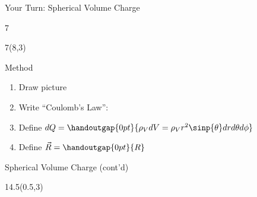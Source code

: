 \begin{lesson20}
\begin{frame}{Your Turn: Spherical Volume Charge}
\begin{textblock}{7}
\end{textblock}
\begin{textblock}{7}(8,3)

\begin{myblock}[0.94]{Method}
	\begin{enumerate}
	\setlength\itemsep{8pt}
		\item Draw picture 
		\item Write ``Coulomb's Law'':
			
			\vspace{-18pt}
			\vspace{-28pt}
			
		\item Define $dQ = \handoutgap{0pt}{\rho_V dV = \rho_V r^2\sinp{\theta}dr d\theta d\phi}$ 
		
		\item Define $\vec{R} = \handoutgap{0pt}{R}$
		
		\vspace{-12pt}
		
		\vspace{-12pt}
				
	\end{enumerate}
\end{myblock}
	
\end{textblock}
\end{frame}



\begin{frame}{Spherical Volume Charge (cont'd)}
\begin{textblock}{14.5}(0.5,3)


\end{textblock}
\end{frame}
\end{lesson20}
